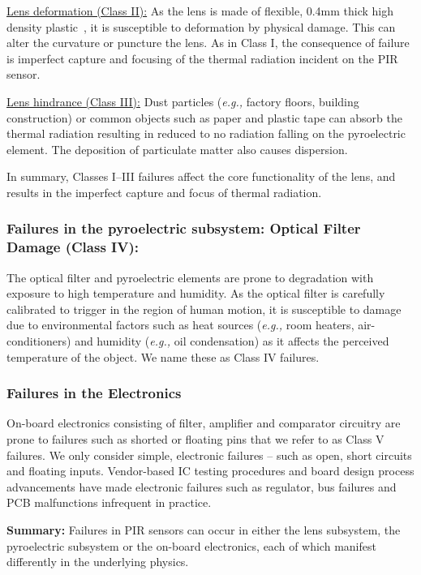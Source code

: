 \documentclass[manuscript]{acmart}
\newcommand{\eg}{{\it e.g.,}\xspace}
\begin{document}
\noindent \underline{Lens deformation (Class II):} As the lens is made of flexible, 0.4mm thick high density plastic~\cite{fresnel}, it is susceptible to deformation by physical damage. This can alter the curvature or puncture the lens. As in Class I, the consequence of failure is imperfect capture and focusing of the thermal radiation incident on the PIR sensor.

\noindent \underline{Lens hindrance (Class III):} Dust particles (\eg factory floors, building construction) or common objects such as paper and plastic tape can absorb the thermal radiation resulting in reduced to no radiation falling on the pyroelectric element. The deposition of particulate matter also causes dispersion.

In summary, Classes I--III failures affect the core functionality of the lens, and results in the imperfect capture and focus of thermal radiation.

\subsubsection{\textbf{Failures in the pyroelectric subsystem}: Optical Filter Damage (Class IV):} The optical filter and pyroelectric elements are prone to degradation with exposure to high temperature and humidity. As the optical filter is carefully calibrated to trigger in the region of human motion, it is susceptible to damage due to environmental factors such as heat sources (\eg room heaters, air-conditioners) and humidity (\eg oil condensation) as it affects the perceived temperature of the object. We name these as Class IV failures.

\subsubsection{\textbf{Failures in the Electronics}} On-board electronics consisting of filter, amplifier and comparator circuitry are prone to failures such as shorted or floating pins that we refer to as Class V failures. We only consider simple, electronic failures -- such as open, short circuits and floating inputs. Vendor-based IC testing procedures and board design process advancements have made electronic failures such as regulator, bus failures and PCB malfunctions infrequent in practice.


\noindent \textbf{Summary:} Failures in PIR sensors can occur in either the lens subsystem, the pyroelectric subsystem or the on-board electronics, each of which manifest differently in the underlying physics.
\end{document}

